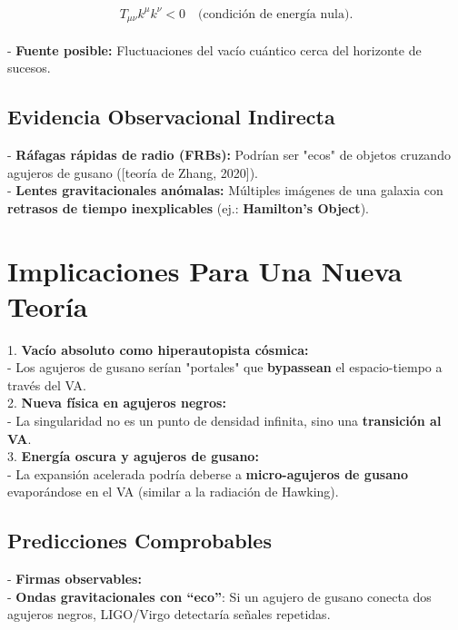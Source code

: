 \documentclass[a4paper]{article}
\theoremstyle{definition}
\theoremstyle{remark}
\numberwithin{equation}{section}
\begin{document}
	\[
	T_{\mu\nu} k^\mu k^\nu < 0 \quad \text{(condición de energía nula)}.
	\] \\
	
	- \textbf{Fuente posible:} Fluctuaciones del vacío cuántico cerca del horizonte de sucesos.
	
	
	\subsection{Evidencia Observacional Indirecta}
	
	- \textbf{Ráfagas rápidas de radio (FRBs):} Podrían ser "ecos" de objetos cruzando agujeros de gusano ([teoría de Zhang, 2020]).\\
	
	- \textbf{Lentes gravitacionales anómalas:} Múltiples imágenes de una galaxia con \textbf{retrasos de tiempo inexplicables} (ej.: \textbf{Hamilton’s Object}).
	
	\section{Implicaciones Para Una Nueva Teoría}
	
	1. \textbf{Vacío absoluto como hiperautopista cósmica:}\\
	
	- Los agujeros de gusano serían "portales" que \textbf{bypassean} el espacio-tiempo a través del VA.\\
	
	2. \textbf{Nueva física en agujeros negros:}\\
	
	- La singularidad no es un punto de densidad infinita, sino una \textbf{transición al VA}.\\
	
	3. \textbf{Energía oscura y agujeros de gusano:}\\
	
	- La expansión acelerada podría deberse a \textbf{micro-agujeros de gusano} evaporándose en el VA (similar a la radiación de Hawking).
	
	\subsection{Predicciones Comprobables}
	
	- \textbf{Firmas observables:}\\
	
	- \textbf{Ondas gravitacionales con ``eco''}: Si un agujero de gusano conecta dos agujeros negros, LIGO/Virgo detectaría señales repetidas.\\
	
\end{document}
